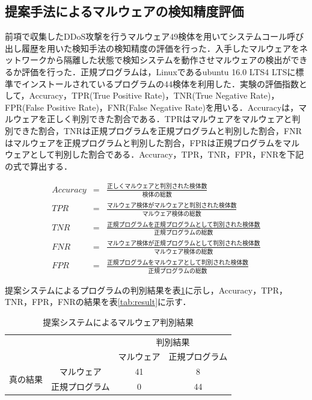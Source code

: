 \newpage 
\subsection{提案手法によるマルウェアの検知精度評価}
前項で収集したDDoS攻撃を行うマルウェア49検体を用いてシステムコール呼び出し履歴を用いた検知手法の検知精度の評価を行った．入手したマルウェアをネットワークから隔離した状態で検知システムを動作させマルウェアの検出ができるか評価を行った．正規プログラムは，Linuxであるubuntu  16.0 LTS4 LTSに標準でインストールされているプログラムの44検体を利用した．実験の評価指数として，Accuracy，TPR(True Positive Rate)，TNR(True Negative Rate)，FPR(False Positive Rate)，FNR(False Negative Rate)を用いる．Accuracyは，マルウェアを正しく判別できた割合である．TPRはマルウェアをマルウェアと判別できた割合，TNRは正規プログラムを正規プログラムと判別した割合，FNRはマルウェアを正規プログラムと判別した割合，FPRは正規プログラムをマルウェアとして判別した割合である．Accuracy，TPR，TNR，FPR，FNRを下記の式で算出する．

\begin{eqnarray}
    Accuracy & = & \frac{正しくマルウェアと判別された検体数}{検体の総数}\\
    TPR & = & \frac{マルウェア検体がマルウェアと判別された検体数}{マルウェア検体の総数}\\
    TNR & = & \frac{正規プログラムを正規プログラムとして判別された検体数}{正規プログラムの総数}\\
    FNR & = & \frac{マルウェア検体が正規プログラムとして判別された検体数}{マルウェア検体の総数}\\ 
    FPR & = & \frac{正規プログラムをマルウェアとして判別された検体数}{正規プログラムの総数}
\end{eqnarray}

提案システムによるプログラムの判別結果を表\ref{tab:detect}に示し，Accuracy，TPR，TNR，FPR，FNRの結果を表\ref{tab:result}に示す．

\begin{table}[h]
    \centering
    \caption{提案システムによるマルウェア判別結果}
    \label{tab:detect}
    \begin{tabular}{cc|c|c|}
    \cline{3-4}
    & \multicolumn{1}{l|}{} & \multicolumn{2}{c|}{判別結果} \\ \cline{3-4} 
    &                       & マルウェア      & 正規プログラム      \\ \hline
    \multicolumn{1}{|c|}{\multirow{2}{*}{真の結果}} & マルウェア                 & 41         & 8            \\ \cline{2-4} 
    \multicolumn{1}{|c|}{}                      & 正規プログラム               & 0          & 44           \\ \hline
    \end{tabular}
    \end{table}

